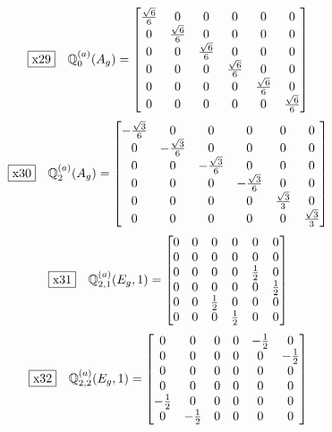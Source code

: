 \documentclass[fleqn,10pt,landscape]{jsarticle}
\begin{document}
\begin{dmath*}
\fbox{x29}\quad \mathbb{Q}_{0}^{(a)}(A_{g})=\begin{bmatrix} \frac{\sqrt{6}}{6} & 0 & 0 & 0 & 0 & 0 \\ 0 & \frac{\sqrt{6}}{6} & 0 & 0 & 0 & 0 \\ 0 & 0 & \frac{\sqrt{6}}{6} & 0 & 0 & 0 \\ 0 & 0 & 0 & \frac{\sqrt{6}}{6} & 0 & 0 \\ 0 & 0 & 0 & 0 & \frac{\sqrt{6}}{6} & 0 \\ 0 & 0 & 0 & 0 & 0 & \frac{\sqrt{6}}{6} \end{bmatrix}
\end{dmath*}
\begin{dmath*}
\fbox{x30}\quad \mathbb{Q}_{2}^{(a)}(A_{g})=\begin{bmatrix} - \frac{\sqrt{3}}{6} & 0 & 0 & 0 & 0 & 0 \\ 0 & - \frac{\sqrt{3}}{6} & 0 & 0 & 0 & 0 \\ 0 & 0 & - \frac{\sqrt{3}}{6} & 0 & 0 & 0 \\ 0 & 0 & 0 & - \frac{\sqrt{3}}{6} & 0 & 0 \\ 0 & 0 & 0 & 0 & \frac{\sqrt{3}}{3} & 0 \\ 0 & 0 & 0 & 0 & 0 & \frac{\sqrt{3}}{3} \end{bmatrix}
\end{dmath*}
\begin{dmath*}
\fbox{x31}\quad \mathbb{Q}_{2,1}^{(a)}(E_{g},1)=\begin{bmatrix} 0 & 0 & 0 & 0 & 0 & 0 \\ 0 & 0 & 0 & 0 & 0 & 0 \\ 0 & 0 & 0 & 0 & \frac{1}{2} & 0 \\ 0 & 0 & 0 & 0 & 0 & \frac{1}{2} \\ 0 & 0 & \frac{1}{2} & 0 & 0 & 0 \\ 0 & 0 & 0 & \frac{1}{2} & 0 & 0 \end{bmatrix}
\end{dmath*}
\begin{dmath*}
\fbox{x32}\quad \mathbb{Q}_{2,2}^{(a)}(E_{g},1)=\begin{bmatrix} 0 & 0 & 0 & 0 & - \frac{1}{2} & 0 \\ 0 & 0 & 0 & 0 & 0 & - \frac{1}{2} \\ 0 & 0 & 0 & 0 & 0 & 0 \\ 0 & 0 & 0 & 0 & 0 & 0 \\ - \frac{1}{2} & 0 & 0 & 0 & 0 & 0 \\ 0 & - \frac{1}{2} & 0 & 0 & 0 & 0 \end{bmatrix}
\end{dmath*}
\end{document}

